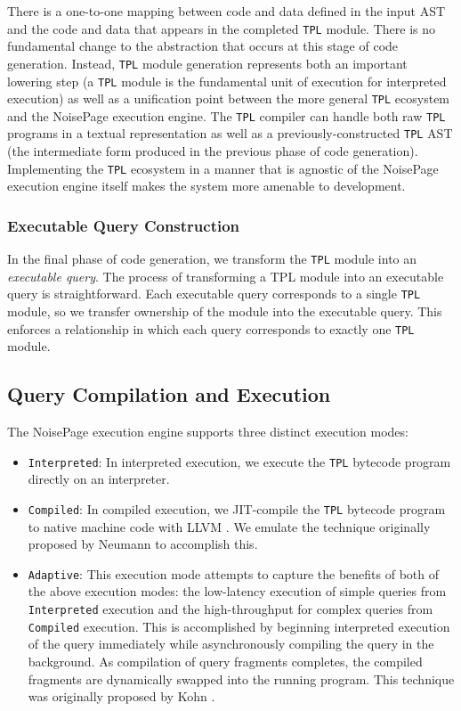 \documentclass{vldb}
\newcommand{\tpl}{\texttt{TPL}\xspace}
\begin{document}
There is a one-to-one mapping between code and data defined in the input AST and the code and data that appears in the completed \tpl module. There is no fundamental change to the abstraction that occurs at this stage of code generation. Instead, \tpl module generation represents both an important lowering step (a \tpl module is the fundamental unit of execution for interpreted execution) as well as a unification point between the more general \tpl ecosystem and the NoisePage execution engine. The \tpl compiler can handle both raw \tpl programs in a textual representation as well as a previously-constructed \tpl AST (the intermediate form produced in the previous phase of code generation). Implementing the \tpl ecosystem in a manner that is agnostic of the NoisePage execution engine itself makes the system more amenable to development.

\subsubsection{Executable Query Construction} 

In the final phase of code generation, we transform the \tpl module into an \textit{executable query}. The process of transforming a TPL module into an executable query is straightforward. Each executable query corresponds to a single \tpl module, so we transfer ownership of the module into the executable query. This enforces a relationship in which each query corresponds to exactly one \tpl module.

\subsection{Query Compilation and Execution}

The NoisePage execution engine supports three distinct execution modes:

\begin{itemize}
    \item \texttt{Interpreted}: In interpreted execution, we execute the \tpl bytecode program directly on an interpreter.
    \item \texttt{Compiled}: In compiled execution, we JIT-compile the \tpl bytecode program to native machine code with LLVM \cite{llvm}. We emulate the technique originally proposed by Neumann \cite{neumann11} to accomplish this.
    \item \texttt{Adaptive}: This execution mode attempts to capture the benefits of both of the above execution modes: the low-latency execution of simple queries from \texttt{Interpreted} execution and the high-throughput for complex queries from \texttt{Compiled} execution. This is accomplished by beginning interpreted execution of the query immediately while asynchronously compiling the query in the background. As compilation of query fragments completes, the compiled fragments are dynamically swapped into the running program. This technique was originally proposed by Kohn \cite{kohn18}.
\end{itemize}
\end{document}
